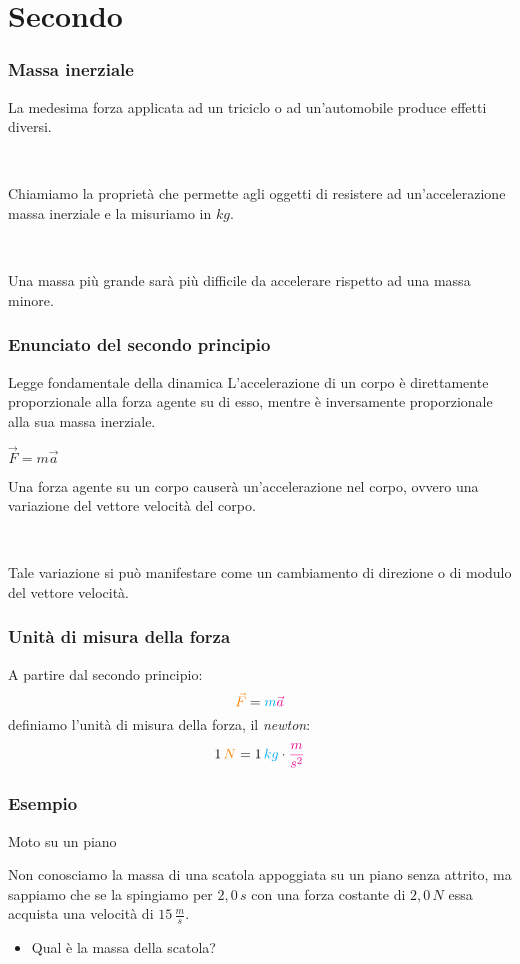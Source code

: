 \documentclass[]{beamer}
\theoremstyle{plain}
\begin{document}
\section{Secondo}


\begin{frame}
\frametitle{Massa inerziale}
La medesima forza applicata ad un triciclo o ad un'automobile produce effetti diversi.\pause

~

Chiamiamo la proprietà che permette agli oggetti di resistere ad un'accelerazione \alert{massa inerziale} e la misuriamo in $ kg $.\pause

~

Una massa più grande sarà più difficile da accelerare rispetto ad una massa minore.
\end{frame}


\begin{frame}
  \frametitle{Enunciato del secondo principio}
\begin{block}{Legge fondamentale della dinamica}
L'accelerazione di un corpo è direttamente proporzionale alla forza agente su di esso, mentre è inversamente proporzionale alla sua massa inerziale.\pause
\begin{center}
\colorbox{blue!30}{$ \vec{F} = m \vec{a} $}
\end{center}
\end{block}
\pause
Una forza agente su un corpo causerà un'accelerazione nel corpo, ovvero una \alert<3>{variazione del vettore velocità} del corpo.\pause

~

Tale variazione si può manifestare come un \alert<4>{cambiamento di direzione o di modulo} del vettore velocità.
\end{frame}


\begin{frame}
  \frametitle{Unità di misura della forza}
  A partire dal secondo principio: \[ \textcolor{orange}{\vec{F}} = \textcolor{cyan}{m}  \textcolor{magenta}{\vec{a}}  \]
  definiamo l'unità di misura della forza, il \emph{newton}:
  \[ 1 \, \textcolor{orange}{N} = 1 \, \textcolor{cyan}{kg} \cdot \textcolor{magenta}{\frac{m}{s^2}} \]
\end{frame}


\begin{frame}
\frametitle{Esempio}
\begin{exampleblock}{Moto su un piano}
{\small Non conosciamo la massa di una scatola appoggiata su un piano senza attrito, ma sappiamo che se la spingiamo per $ 2,0 \, s $ con una forza costante di $ 2,0 \, N $ essa acquista una velocità di $ 15 \, \frac{m}{s} $. 

\begin{itemize}
  \item Qual è la massa della scatola?
\end{itemize}}
\end{exampleblock}
\end{frame}
\end{document}
